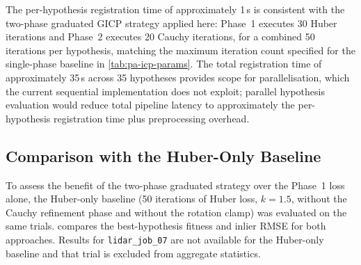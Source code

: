 The per-hypothesis registration time of approximately 1\,s is consistent with the two-phase graduated GICP strategy applied here: Phase~1 executes 30 Huber iterations and Phase~2 executes 20 Cauchy iterations, for a combined 50 iterations per hypothesis, matching the maximum iteration count specified for the single-phase baseline in \cref{tab:pa-icp-params}. The total registration time of approximately 35\,s across 35 hypotheses provides scope for parallelisation, which the current sequential implementation does not exploit; parallel hypothesis evaluation would reduce total pipeline latency to approximately the per-hypothesis registration time plus preprocessing overhead.

\subsection{Comparison with the Huber-Only Baseline}
\label{subsec:pa-results-baseline-comparison}

To assess the benefit of the two-phase graduated strategy over the Phase~1 loss alone, the Huber-only baseline (50 iterations of Huber loss, $k = 1.5$, without the Cauchy refinement phase and without the rotation clamp) was evaluated on the same trials.  compares the best-hypothesis fitness and inlier RMSE for both approaches. Results for \texttt{lidar\_job\_07} are not available for the Huber-only baseline and that trial is excluded from aggregate statistics.

